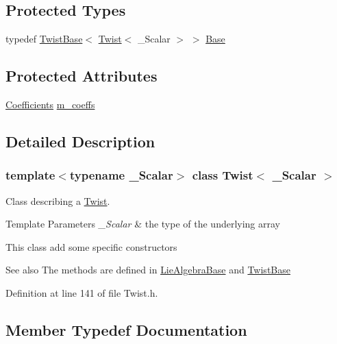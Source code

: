 \subsection*{Protected Types}
\begin{DoxyCompactItemize}
\item 
typedef \hyperlink{class_twist_base}{Twist\+Base}$<$ \hyperlink{class_twist}{Twist}$<$ \+\_\+\+Scalar $>$ $>$ \hyperlink{class_twist_a83c55648035a111abdce59e32880a710}{Base}
\end{DoxyCompactItemize}
\subsection*{Protected Attributes}
\begin{DoxyCompactItemize}
\item 
\hyperlink{class_twist_a1bc0976a0f06b366421639350134222b}{Coefficients} \hyperlink{class_twist_ac4b3ab83b5a42bc592b55dbb94905c4e}{m\+\_\+coeffs}
\end{DoxyCompactItemize}


\subsection{Detailed Description}
\subsubsection*{template$<$typename \+\_\+\+Scalar$>$\newline
class Twist$<$ \+\_\+\+Scalar $>$}

Class describing a \hyperlink{class_twist}{Twist}. 


\begin{DoxyTemplParams}{Template Parameters}
{\em \+\_\+\+Scalar} & the type of the underlying array\\
\hline
\end{DoxyTemplParams}
This class add some specific constructors

\begin{DoxySeeAlso}{See also}
The methods are defined in \hyperlink{class_lie_algebra_base}{Lie\+Algebra\+Base} and \hyperlink{class_twist_base}{Twist\+Base} 
\end{DoxySeeAlso}


Definition at line 141 of file Twist.\+h.



\subsection{Member Typedef Documentation}
\hypertarget{class_twist_a83c55648035a111abdce59e32880a710}{}\label{class_twist_a83c55648035a111abdce59e32880a710} 
